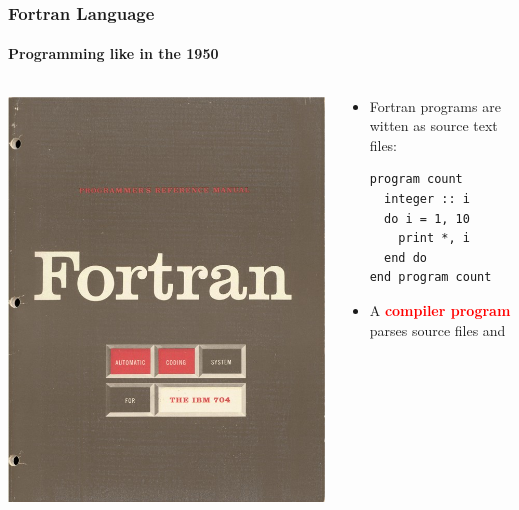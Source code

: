 \documentclass[unknownkeysallowed, 10pt, a4 paper, handout]{beamer}
\newcommand{\focus}[1]{\textbf{\textcolor{red}{#1}}}
\begin{document}
\begin{frame}[label=Fortran, fragile=singleslide]
  \frametitle{Fortran Language}
  \framesubtitle{Programming like in the 1950}
  \begin{columns}[T]
    \begin{column}{.23\textwidth}
      \vspace{30pt}
      \includegraphics[scale=0.15]{pics/Fortran_acs_cover.jpeg}
    \end{column}
    \hfill
    \begin{column}{.76\textwidth}
      \begin{itemize}
        \item Fortran programs are witten as source text files: \\
          \footnotesize{
            \begin{verbatim}
program count
  integer :: i
  do i = 1, 10
    print *, i
  end do
end program count
            \end{verbatim}
          }
        \item \normalsize{A \focus{compiler program} parses source files and
}
\end{itemize}
\end{column}
\end{columns}
\end{frame}
\end{document}
